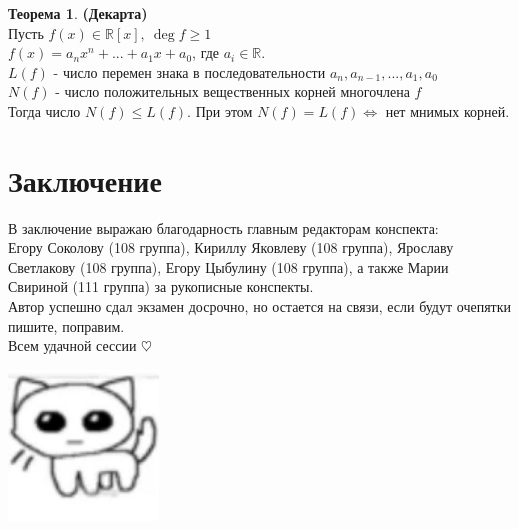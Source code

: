 \documentclass[a4paper, 12pt]{article}
\newcommand{\R}{\mathbb R}
\theoremstyle{definition}
\newtheorem*{theorem}{Теорема}
\begin{document}
  \begin{theorem} \textbf{(Декарта)}\\ 
    Пусть $f(x) \in \R [x], \ \deg f \geq 1$\\
    $f(x) = a_nx^n + ... + a_1x + a_0$, где $a_i \in \R.$\\
    $L(f)$ - число перемен знака в последовательности $a_n, a_{n-1},...,a_1,a_0$\\ 
    $N(f)$ - число положительных вещественных корней многочлена $f$\\
    Тогда число $N(f) \leq L(f)$. При этом $N(f) = L(f) \Longleftrightarrow $ нет мнимых корней.   
  \end{theorem} 
  \newpage

  \section*{Заключение}
  В заключение выражаю благодарность главным редакторам конспекта: \\Егору Соколову (108 группа), Кириллу Яковлеву (108 группа), Ярославу Светлакову (108 группа), Егору Цыбулину (108 группа), а также Марии Свириной (111 группа) за рукописные конспекты.\\
  Автор успешно сдал экзамен досрочно, но остается на связи, если будут очепятки пишите, поправим. \\
  Всем удачной сессии $\heartsuit$ 

  \begin{center}
    \includegraphics[width=4cm]{kotik.jpg}
  \end{center}

\end{document}
